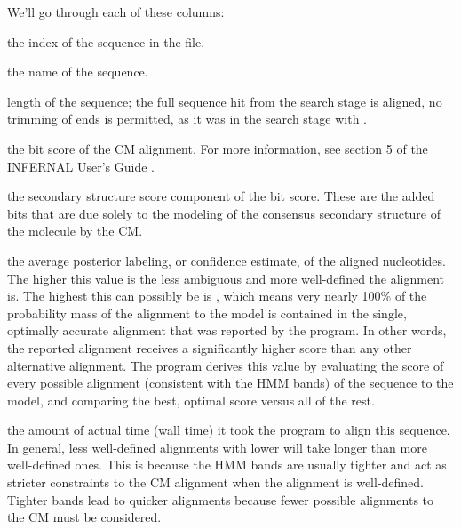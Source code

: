We'll go through each of these columns:

\begin{wideitem}
\item[\emprog{seq idx}] the index of the sequence in the file.

\item[\emprog{seq name}] the name of the sequence.

\item[\emprog{len}] length of the sequence; the full sequence hit from 
  the search stage is aligned, no trimming of ends is permitted, as it was in the search
  stage with .

\item[\emprog{total}] the bit score of the CM alignment. For more
  information, see section 5 of the INFERNAL User's Guide \cite{Nawrocki09}.

\item[\emprog{struct}] the secondary structure score component of the
   bit score. These are the added bits that are due solely
  to the modeling of the consensus secondary structure of the
  molecule by the CM\@. 
  
\item[\emprog{avg prob}] the average posterior labeling, or confidence
  estimate, of the aligned nucleotides. The higher this value is the less
  ambiguous and more well-defined the alignment is. The highest this
  can possibly be is , which means very nearly 100\% of
  the probability mass of the alignment to the model is contained in
  the single, optimally accurate alignment that was reported by the
  program. In other words, the reported alignment receives a
  significantly higher score than any other alternative alignment. The
  program derives this value by evaluating the score of every possible
  alignment (consistent with the HMM bands) of the sequence to the
  model, and comparing the best, optimal score versus all of the
  rest. 

\item[\emprog{elapsed}] the amount of actual time (wall time) it took
  the program to align this sequence. In general, less well-defined
  alignments with lower  will take longer than more
  well-defined ones. This is because the HMM bands are usually tighter
  and act as stricter constraints to the CM alignment when the
  alignment is well-defined. Tighter bands lead to quicker alignments
  because fewer possible alignments to the CM must be considered.
\end{wideitem}

